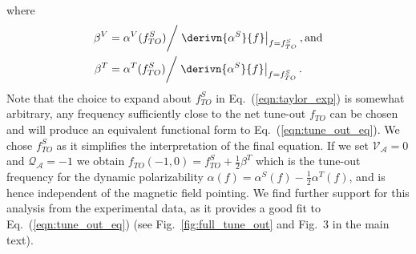 	where
	 \begin{align}
	  \beta^V &= \alpha^V(f^{S}_{TO}) \bigg/ \left. \derivn{\alpha^S}{f} \right|_{f=f^{S}_{TO}} \mathrm{, and}\\
	  \beta^T &= \alpha^T(f^{S}_{TO}) \bigg/ \left. \derivn{\alpha^S}{f} \right|_{f=f^{S}_{TO}} .
	 \end{align}
	Note that the choice to expand about \(f^{S}_{TO}\) in Eq.~(\ref{eqn:taylor_exp}) is somewhat arbitrary, any frequency sufficiently close to the net tune-out \(f_{TO}\) can be chosen and will produce an equivalent functional form to Eq.~(\ref{eqn:tune_out_eq}).  We chose \(f^{S}_{TO}\) as it simplifies the interpretation of the final equation. If we set \(\mathcal{V_{A}}=0\) and \(\mathcal{Q_{A}}=-1\) we obtain \(f_{TO}(-1,0) = f^{S}_{TO} + \frac{1}{2} \beta^T\) which is the tune-out frequency for the dynamic polarizability \(\alpha(f) = \alpha^S(f) - \frac{1}{2}  \alpha^T(f)\), and is hence independent of the magnetic field pointing. We find further support for this analysis from the experimental data, as it provides a good fit to Eq.~(\ref{eqn:tune_out_eq}) (see Fig.~\ref{fig:full_tune_out} and Fig.~3 in the main text).
	  
